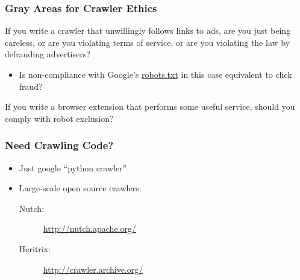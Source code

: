 \documentclass{beamer}
\begin{document}
\begin{frame} \frametitle{Gray Areas for Crawler Ethics }

If you write a crawler that unwillingly follows links to ads, are you
just being careless, or are you violating terms of service, or are you
violating the law by defrauding advertisers?
\begin{itemize}
\item Is non-compliance with Google's \url{robots.txt} in this case equivalent to click fraud?
\end{itemize}

If you write a browser extension that performs some useful service, should you comply with robot exclusion?
\end{frame}










\begin{frame} \frametitle{Need Crawling Code?}

\begin{itemize}
\item Just google ``python crawler''
\item Large-scale open source crawlers:
\begin{description}
\item [Nutch:] \url{http://nutch.apache.org/}
\item [Heritrix:] \url{http://crawler.archive.org/}
\end{description}

\end{itemize}
\end{frame}



\end{document}
